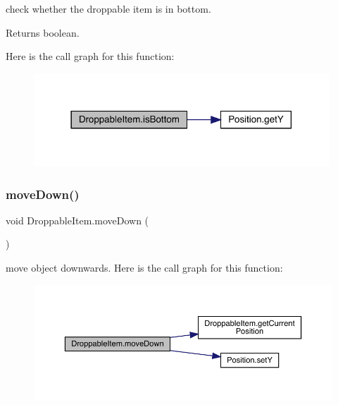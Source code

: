 check whether the droppable item is in bottom. \begin{DoxyReturn}{Returns}
boolean. 
\end{DoxyReturn}
Here is the call graph for this function\+:
\nopagebreak
\begin{figure}[H]
\begin{center}
\leavevmode
\includegraphics[width=314pt]{class_droppable_item_a5cbe880513fffe6c70678bd3b86ca934_cgraph}
\end{center}
\end{figure}
\mbox{\label{class_droppable_item_ac1870d36f1861a4574414355983d56c5}} 
\subsubsection{\texorpdfstring{move\+Down()}{moveDown()}}
{\footnotesize\ttfamily void Droppable\+Item.\+move\+Down (\begin{DoxyParamCaption}{ }\end{DoxyParamCaption})\hspace{0.3cm}{\ttfamily [inline]}}

move object downwards. Here is the call graph for this function\+:
\nopagebreak
\begin{figure}[H]
\begin{center}
\leavevmode
\includegraphics[width=350pt]{class_droppable_item_ac1870d36f1861a4574414355983d56c5_cgraph}
\end{center}
\end{figure}
\mbox{\label{class_droppable_item_a8064bb69947880b73bf164ed8c73eaef}} 
